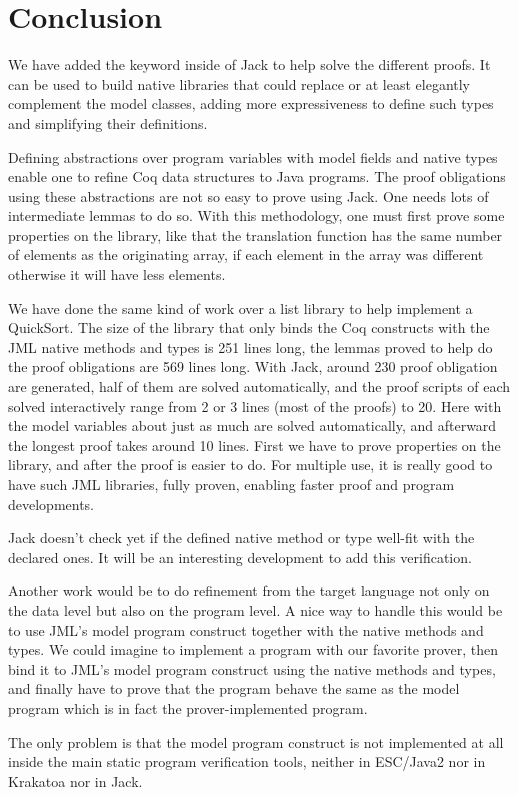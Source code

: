 \section{Conclusion}
We have added the  keyword inside of Jack to help solve the 
different proofs. It can be used to build  native libraries that could 
replace or at least elegantly complement the model classes, adding more 
expressiveness to define such types and  simplifying their definitions.

Defining abstractions over program variables with model fields and native types
 enable one to refine Coq data structures to Java programs. 
The proof obligations using these abstractions are not so easy to prove 
using Jack. 
One needs lots of intermediate lemmas to do so. 
With this methodology, one must first prove some properties on the library, 
like that the translation function  has the same number 
of elements as the originating array, if each element in the array
was different otherwise it will have less elements.

We have done the same kind of work over a list library to help implement a 
QuickSort. The size of the library that only binds the Coq constructs with 
the JML native methods and types is 251 lines long,
the lemmas proved to help do the proof obligations are 569 lines long. 
With Jack, around 230 proof obligation are generated, half of them are 
solved automatically, and the proof scripts of each solved interactively 
range from 2 or 3 lines (most of the proofs) to 20. 
Here with the model variables about just as much are solved automatically, 
and afterward the longest proof takes around 10 lines.
First we have to prove properties on the library, and after the proof 
is easier to do. 
For multiple use, it is really good to have such JML libraries, 
fully proven, enabling faster proof and program developments.

Jack doesn't check yet if the defined native method or type well-fit with
 the declared ones.
It will be an interesting development to add this verification.


Another work would be to do  refinement from the 
target language not only on the data level but also on the program
level. A nice way to handle this would be to use JML's model program construct
together with the native methods and types. We could imagine 
to implement a program with our favorite prover, then bind it
to JML's model program construct using the native methods and types,
 and finally have to prove that the program behave the same
as the model program which is in fact the prover-implemented program.

The only problem is that the model program construct is not implemented at
all inside the main static program verification tools, neither in ESC/Java2 nor
 in Krakatoa nor in Jack. 




